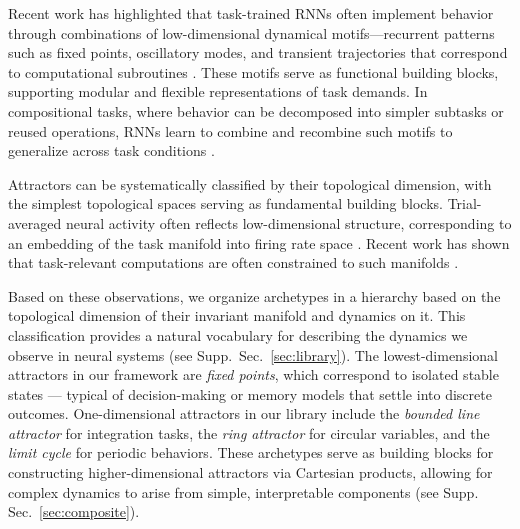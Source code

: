 \documentclass{article}
\theoremstyle{definition} \newtheorem{definition}{Definition}  \newtheorem{example}{Example}
\theoremstyle{remark} \newtheorem{remark}{Remark}
\newcounter{ct}
\begin{document}
Recent work has highlighted that task-trained RNNs often implement behavior through combinations of low-dimensional dynamical motifs—recurrent patterns such as fixed points, oscillatory modes, and transient trajectories that correspond to computational subroutines \citep{driscoll2024flexible}.
These motifs serve as functional building blocks, supporting modular and flexible representations of task demands. 
In compositional tasks, where behavior can be decomposed into simpler subtasks or reused operations, RNNs learn to combine and recombine such motifs to generalize across task conditions \citep{tafazoli2024building}.

Attractors can be systematically classified by their topological dimension, with the simplest topological spaces serving as fundamental building blocks.
Trial-averaged neural activity often reflects low-dimensional structure, corresponding to an embedding of the task manifold into firing rate space \citep{gao2015simplicity}.
Recent work has shown that task-relevant computations are often constrained to such manifolds \citep{langdon2023unifying,can2021emergence,cueva2021continuous,gort2024emergence,mishra2021continual,chaudhuri2019attractor,ghazizadeh2021slowmanifold,duncker2021dynamics, pezon2024linking,fortunato2024nonlinear}.

Based on these observations, we organize archetypes in a hierarchy based on the topological dimension of their invariant manifold and dynamics on it.
This classification provides a natural vocabulary for describing the dynamics we observe in neural systems (see Supp.~Sec.~\ref{sec:library}). 
The lowest-dimensional attractors in our framework are \emph{fixed points}, which correspond to isolated stable states — typical of decision-making or memory models that settle into discrete outcomes.
One-dimensional attractors in our library include the \emph{bounded line attractor} for integration tasks, the \emph{ring attractor} for circular variables, and the \emph{limit cycle} for periodic behaviors.
These archetypes serve as building blocks for constructing higher-dimensional attractors via Cartesian products, allowing for complex dynamics to arise from simple, interpretable components (see Supp. Sec.~\ref{sec:composite}).
\end{document}
